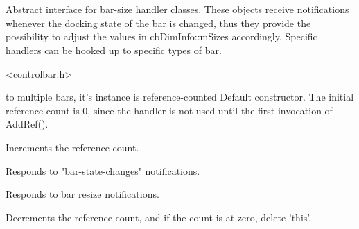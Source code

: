%
%


\section{}\label{cbbardimhandlerbase}


Abstract interface for bar-size handler classes.
These objects receive notifications whenever the docking
state of the bar is changed, thus they provide the possibility
to adjust the values in cbDimInfo::mSizes accordingly.
Specific handlers can be hooked up to specific types of bar.




<controlbar.h>




\label{cbbardimhandlerbasecbbardimhandlerbase}


to multiple bars, it's instance is
reference-counted
Default constructor. The initial reference count is 0, since
the handler is not used until the first invocation of AddRef().


\label{cbbardimhandlerbaseaddref}


Increments the reference count.


\label{cbbardimhandlerbaseonchangebarstate}


Responds to "bar-state-changes" notifications.


\label{cbbardimhandlerbaseonresizebar}


Responds to bar resize notifications.


\label{cbbardimhandlerbaseremoveref}


Decrements the reference count, and if the count is at zero,
delete 'this'.

